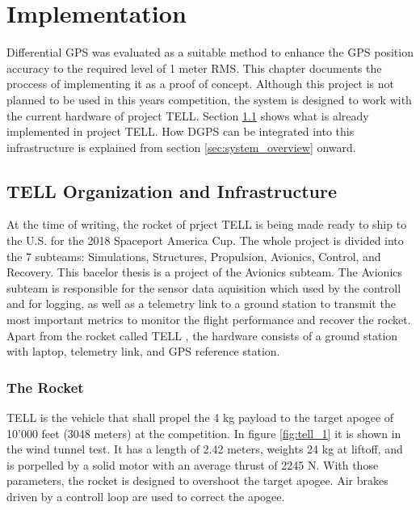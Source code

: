 \chapter{Implementation}

Differential GPS was evaluated as a suitable method to enhance the GPS position accuracy to the required level of 1 meter RMS.
This chapter documents the proccess of implementing it as a proof of concept.
Although this project is not planned to be used in this years competition, the system is designed to work with the current hardware of project TELL.
Section \ref{sec:tell_infrastructure} shows what is already implemented in project TELL.
How DGPS can be integrated into this infrastructure is explained from section \ref{sec:system_overview} onward.

\section{TELL Organization and Infrastructure}\label{sec:tell_infrastructure}

At the time of writing, the rocket of prject TELL is being made ready to ship to the U.S. for the 2018 Spaceport America Cup.
The whole project is divided into the 7 subteams: Simulations, Structures, Propulsion, Avionics, Control, and Recovery.
This bacelor thesis is a project of the Avionics subteam.
The Avionics subteam is responsible for the sensor data aquisition which used by the controll and for logging, as well as a telemetry link to a ground station to transmit the most important metrics to monitor the flight performance and recover the rocket.
Apart from the rocket called TELL , the hardware consists of a ground station with laptop, telemetry link, and GPS reference station.

\subsection{The Rocket}

TELL  is the vehicle that shall propel the 4 kg payload to the target apogee of 10'000 feet (3048 meters) at the competition.
In figure \ref{fig:tell_1} it is shown in the wind tunnel test.
It has a length of 2.42 meters, weights 24 kg at liftoff, and is porpelled by a solid motor with an average thrust of 2245 N.
With those parameters, the rocket is designed to overshoot the target apogee.
Air brakes driven by a controll loop are used to correct the apogee.

